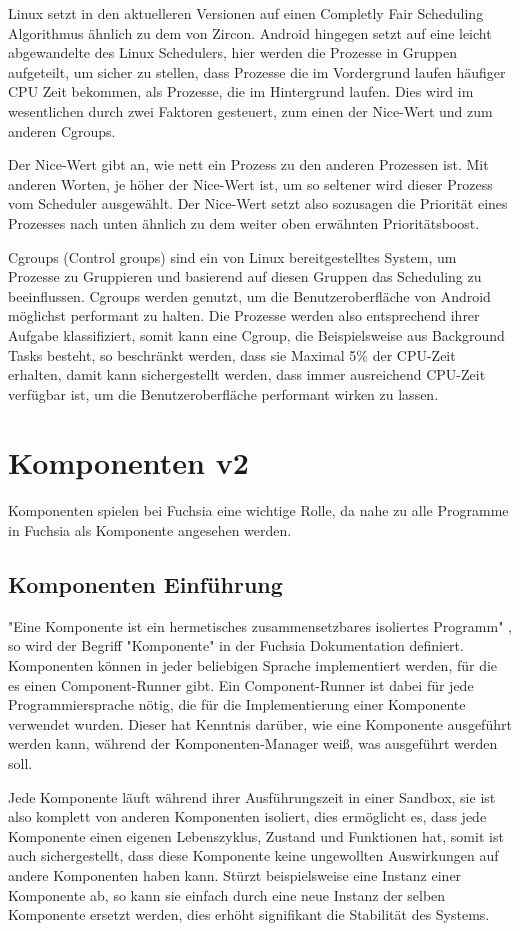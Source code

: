 \documentclass[a4paper]{scrartcl}
\begin{document}
Linux setzt in den aktuelleren Versionen auf einen Completly Fair Scheduling Algorithmus ähnlich zu dem von Zircon. Android hingegen setzt auf eine leicht abgewandelte des Linux Schedulers, hier werden die Prozesse in Gruppen aufgeteilt, um sicher zu stellen, dass Prozesse die im Vordergrund laufen häufiger CPU Zeit bekommen, als Prozesse, die im Hintergrund laufen. Dies wird im wesentlichen durch zwei Faktoren gesteuert, zum einen der Nice-Wert und zum anderen Cgroups.

Der Nice-Wert gibt an, wie nett ein Prozess zu den anderen Prozessen ist. Mit anderen Worten, je höher der Nice-Wert ist, um so seltener wird dieser Prozess vom Scheduler ausgewählt. Der Nice-Wert setzt also sozusagen die Priorität eines Prozesses nach unten ähnlich zu dem weiter oben erwähnten Prioritätsboost.

Cgroups (Control groups) sind ein von Linux bereitgestelltes System, um Prozesse zu Gruppieren und basierend auf diesen Gruppen das Scheduling zu beeinflussen. Cgroups werden genutzt, um die Benutzeroberfläche von Android möglichst performant zu halten. Die Prozesse werden also entsprechend ihrer Aufgabe klassifiziert, somit kann eine Cgroup, die Beispielsweise aus Background Tasks besteht, so beschränkt werden, dass sie Maximal 5\% der CPU-Zeit erhalten, damit kann sichergestellt werden, dass immer ausreichend CPU-Zeit verfügbar ist, um die Benutzeroberfläche performant wirken zu lassen.
\section{Komponenten v2}
Komponenten spielen bei Fuchsia eine wichtige Rolle, da nahe zu alle Programme in Fuchsia als Komponente angesehen werden.
\subsection{Komponenten Einführung}
\label{sec:Components}
"Eine Komponente ist ein hermetisches zusammensetzbares isoliertes Programm" \cite{FuCHSIADOCS}, so wird der Begriff "Komponente" in der Fuchsia Dokumentation definiert. Komponenten können in jeder beliebigen Sprache implementiert werden, für die es einen Component-Runner gibt. Ein Component-Runner ist dabei für jede Programmiersprache nötig, die für die Implementierung einer Komponente verwendet wurden. Dieser hat Kenntnis darüber, wie eine Komponente ausgeführt werden kann, während der Komponenten-Manager weiß, was ausgeführt werden soll.

Jede Komponente läuft während ihrer Ausführungszeit in einer Sandbox, sie ist also komplett von anderen Komponenten isoliert, dies ermöglicht es, dass jede Komponente einen eigenen Lebenszyklus, Zustand und Funktionen hat, somit ist auch sichergestellt, dass diese Komponente keine ungewollten Auswirkungen auf andere Komponenten haben kann. Stürzt beispielsweise eine Instanz einer  Komponente ab, so kann sie einfach durch eine neue Instanz der selben Komponente ersetzt werden, dies erhöht signifikant die Stabilität des Systems.
\end{document}

